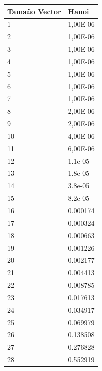 \documentclass[a4paper, 11pt]{article}
\begin{document}
\begin{tabular}{@{}ll@{}}
\toprule
Tamaño Vector & Hanoi    \\ \midrule
1             & 1,00E-06 \\
2             & 1,00E-06 \\
3             & 1,00E-06 \\
4             & 1,00E-06 \\
5             & 1,00E-06 \\
6             & 1,00E-06 \\
7             & 1,00E-06 \\
8             & 2,00E-06 \\
9             & 2,00E-06 \\
10            & 4,00E-06 \\
11            & 6,00E-06 \\
12            & 1.1e-05  \\
13            & 1.8e-05  \\
14            & 3.8e-05  \\
15            & 8.2e-05  \\
16            & 0.000174 \\
17            & 0.000324 \\
18            & 0.000663 \\
19            & 0.001226 \\
20            & 0.002177 \\
21            & 0.004413 \\
22            & 0.008785 \\
23            & 0.017613 \\
24            & 0.034917 \\
25            & 0.069979 \\
26            & 0.138508 \\
27            & 0.276828 \\
28            & 0.552919 \\ \bottomrule
\end{tabular}
\end{document}
